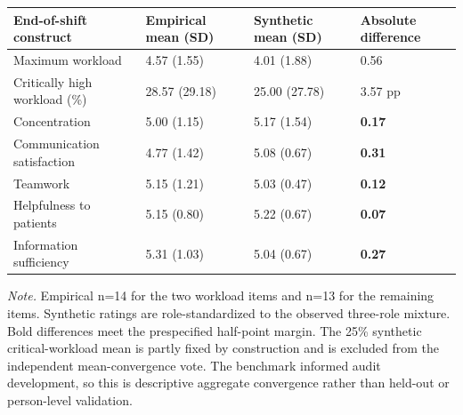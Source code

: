 \begin{tabular}{llll}
\toprule
\textbf{End-of-shift construct} & \textbf{Empirical mean (SD)} & \textbf{Synthetic mean (SD)} & \textbf{Absolute difference} \\
\midrule
Maximum workload & 4.57 (1.55) & 4.01 (1.88) & 0.56 \\
Critically high workload (\%) & 28.57 (29.18) & 25.00 (27.78) & 3.57 pp \\
Concentration & 5.00 (1.15) & 5.17 (1.54) & \textbf{0.17} \\
Communication satisfaction & 4.77 (1.42) & 5.08 (0.67) & \textbf{0.31} \\
Teamwork & 5.15 (1.21) & 5.03 (0.47) & \textbf{0.12} \\
Helpfulness to patients & 5.15 (0.80) & 5.22 (0.67) & \textbf{0.07} \\
Information sufficiency & 5.31 (1.03) & 5.04 (0.67) & \textbf{0.27} \\
\bottomrule
\end{tabular}

\par\footnotesize\textit{Note.} Empirical n=14 for the two workload items and n=13 for the remaining items. Synthetic ratings are role-standardized to the observed three-role mixture. Bold differences meet the prespecified half-point margin. The 25\% synthetic critical-workload mean is partly fixed by construction and is excluded from the independent mean-convergence vote. The benchmark informed audit development, so this is descriptive aggregate convergence rather than held-out or person-level validation.

